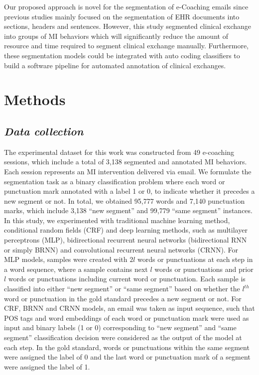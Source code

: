 \documentclass{amia}
\begin{document}
Our proposed approach is novel for the segmentation of e-Coaching emails since previous studies mainly focused on the segmentation of EHR documents into sections, headers and sentences. However, this study segmented clinical exchange into groups of MI behaviors which will significantly reduce the amount of resource and time required to segment clinical exchange manually. Furthermore, these segmentation models could be integrated with auto coding classifiers to build a software pipeline for automated annotation of clinical exchanges.
  
\section*{Methods}
\subsection*{\textit{Data collection}}

The experimental dataset for this work was constructed from 49 e-coaching sessions, which include a total of 3,138 segmented and annotated MI behaviors. Each session represents an MI intervention delivered via email. We formulate the segmentation task as a binary classification problem where each word or punctuation mark annotated with a label 1 or 0, to indicate whether it precedes a new segment or not. In total, we obtained 95,777 words and 7,140 punctuation marks, which include 3,138 ``new segment'' and 99,779 ``same segment'' instances. In this study, we experimented with traditional machine learning method, conditional random fields (CRF)\cite{lafferty2001conditional} and deep learning methods, such as multilayer perceptrons (MLP),\cite{rumelhart1986learning} bidirectional recurrent neural networks (bidirectional RNN or simply BRNN)\cite{schuster1997bidirectional} and convolutional recurrent neural networks (CRNN).\cite{treviso2017sentence} For MLP models, samples were created with $2l$ words or punctuations at each step in a word sequence, where a sample contains next $l$ words or punctuations and prior $l$ words or punctuations including current word or punctuation. Each sample is classified into either ``new segment'' or ``same segment'' based on whether the $l^{th}$ word or punctuation in the gold standard precedes a new segment or not. For CRF, BRNN and CRNN models, an email was taken as input sequence, such that POS tags and word embeddings of each word or punctuation mark were used as input and binary labels (1 or 0) corresponding to ``new segment'' and ``same segment'' classification decision were considered as the output of the model at each step. In the gold standard, words or punctuations within the same segment were assigned the label of 0 and the last word or punctuation mark of a segment were assigned the label of 1.     
\end{document}

